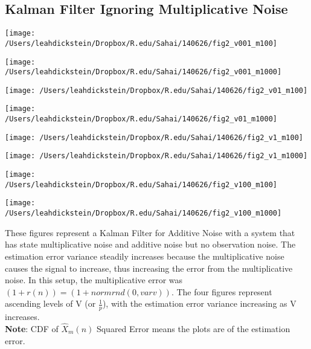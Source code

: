 \documentclass[leqno,twocolumn]{article}
\begin{document}
\subsection{Kalman Filter Ignoring Multiplicative Noise}
\begin{minipage}[c]{0.5\textwidth}
\texttt{[image: /Users/leahdickstein/Dropbox/R.edu/Sahai/140626/fig2\_v001\_m100]}
\end{minipage}
\begin{minipage}[c]{0.5\textwidth}
\texttt{[image: /Users/leahdickstein/Dropbox/R.edu/Sahai/140626/fig2\_v001\_m1000]}
\end{minipage}

\begin{minipage}[c]{0.5\textwidth}
\texttt{[image: /Users/leahdickstein/Dropbox/R.edu/Sahai/140626/fig2\_v01\_m100]}
\end{minipage}
\begin{minipage}[c]{0.5\textwidth}
\texttt{[image: /Users/leahdickstein/Dropbox/R.edu/Sahai/140626/fig2\_v01\_m1000]}
\end{minipage}

\begin{minipage}[c]{0.5\textwidth}
\texttt{[image: /Users/leahdickstein/Dropbox/R.edu/Sahai/140626/fig2\_v1\_m100]}
\end{minipage}
\begin{minipage}[c]{0.5\textwidth}
\texttt{[image: /Users/leahdickstein/Dropbox/R.edu/Sahai/140626/fig2\_v1\_m1000]}
\end{minipage}

\begin{minipage}[c]{0.5\textwidth}
\texttt{[image: /Users/leahdickstein/Dropbox/R.edu/Sahai/140626/fig2\_v100\_m100]}
\end{minipage}
\begin{minipage}[c]{0.5\textwidth}
\texttt{[image: /Users/leahdickstein/Dropbox/R.edu/Sahai/140626/fig2\_v100\_m1000]}
\end{minipage}

These figures represent a Kalman Filter for Additive Noise with a system that has state multiplicative noise and additive noise but no observation noise. The estimation error variance steadily increases because the multiplicative noise causes the signal to increase, thus increasing the error from the multiplicative noise. In this setup, the multiplicative error was $(1+r(n)) = (1+normrnd(0,varv))$. The four figures represent ascending levels of V (or $\frac{1}{p}$), with the estimation error variance increasing as V increases.\\
\textbf{Note}: CDF of $\hat{X}_m(n)$ Squared Error means the plots are of the estimation error.
\end{document}
